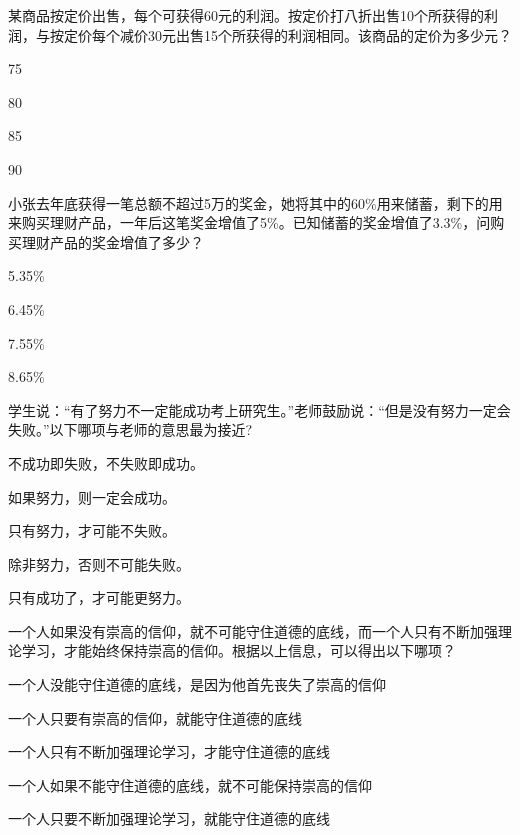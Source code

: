 \documentclass{exam-zh}
\begin{document}
\begin{question}
  某商品按定价出售，每个可获得60元的利润。按定价打八折出售10个所获得的利润，与按定价每个减价30元出售15个所获得的利润相同。该商品的定价为多少元？ \paren
  
  \begin{choices}
    \item 75
    \item 80
    \item 85
    \item 90
  \end{choices}
\end{question}

\begin{question}
  小张去年底获得一笔总额不超过5万的奖金，她将其中的60\%用来储蓄，剩下的用来购买理财产品，一年后这笔奖金增值了5\%。已知储蓄的奖金增值了3.3\%，问购买理财产品的奖金增值了多少？ \paren
  
  \begin{choices}
    \item 5.35\%
    \item 6.45\%
    \item 7.55\%
    \item 8.65\%
  \end{choices}
\end{question}

\begin{question}
  学生说：“有了努力不一定能成功考上研究生。”老师鼓励说：“但是没有努力一定会失败。”以下哪项与老师的意思最为接近? \paren
  
  \begin{choices}
    \item 不成功即失败，不失败即成功。
    \item 如果努力，则一定会成功。
    \item 只有努力，才可能不失败。
    \item 除非努力，否则不可能失败。
    \item 只有成功了，才可能更努力。
  \end{choices}
\end{question}

\begin{question}
  一个人如果没有崇高的信仰，就不可能守住道德的底线，而一个人只有不断加强理论学习，才能始终保持崇高的信仰。根据以上信息，可以得出以下哪项？ \paren

  \begin{choices}
    \item 一个人没能守住道德的底线，是因为他首先丧失了崇高的信仰
    \item 一个人只要有崇高的信仰，就能守住道德的底线
    \item 一个人只有不断加强理论学习，才能守住道德的底线
    \item 一个人如果不能守住道德的底线，就不可能保持崇高的信仰
    \item 一个人只要不断加强理论学习，就能守住道德的底线
  \end{choices}
\end{question}
\end{document}
